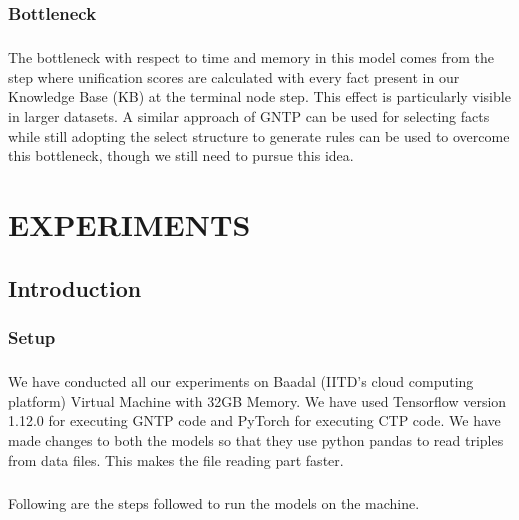 \documentclass[Other]{iitddiss}
\begin{document}
\subsection{Bottleneck}
\paragraph{}
The bottleneck with respect to time and memory in this model comes from the step where unification scores are calculated with every fact present in our Knowledge Base (KB) at the terminal node step. This effect is particularly visible in larger datasets. A similar approach of GNTP can be used for selecting facts while still adopting the select structure to generate rules can be used to overcome this bottleneck, though we still need to pursue this idea. 





\chapter{EXPERIMENTS}
\section{Introduction}
\subsection{Setup}
\paragraph{}
We have conducted all our experiments on Baadal (IITD’s cloud computing platform) Virtual Machine with 32GB Memory. We have used Tensorflow version 1.12.0 for executing GNTP code and PyTorch for executing CTP code. We have made changes to both the models so that they use python pandas to read triples from data files. This makes the file reading part faster.

\paragraph{}
Following are the steps followed to run the models on the machine.
\end{document}
